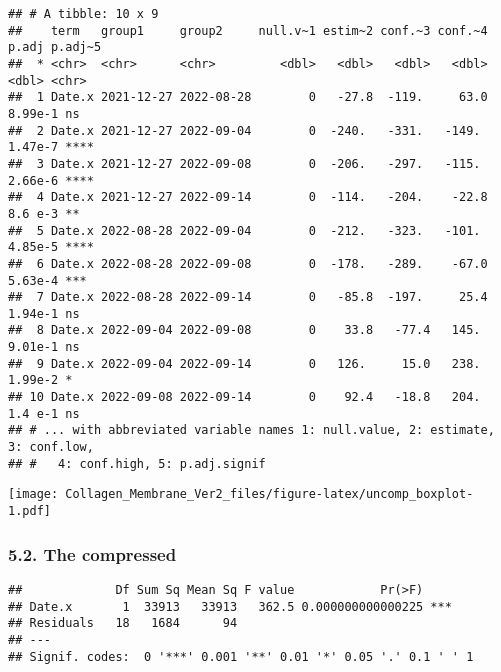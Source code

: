 \documentclass[
]{article}
\newenvironment{Shaded}{\begin{snugshade}}{\end{snugshade}}
\newcommand{\AttributeTok}[1]{\textcolor[rgb]{0.77,0.63,0.00}{#1}}
\newcommand{\FunctionTok}[1]{\textcolor[rgb]{0.00,0.00,0.00}{#1}}
\newcommand{\NormalTok}[1]{#1}
\newcommand{\OtherTok}[1]{\textcolor[rgb]{0.56,0.35,0.01}{#1}}
\newcommand{\SpecialCharTok}[1]{\textcolor[rgb]{0.00,0.00,0.00}{#1}}
\newcommand{\StringTok}[1]{\textcolor[rgb]{0.31,0.60,0.02}{#1}}
\begin{document}
\begin{verbatim}
## # A tibble: 10 x 9
##    term   group1     group2     null.v~1 estim~2 conf.~3 conf.~4   p.adj p.adj~5
##  * <chr>  <chr>      <chr>         <dbl>   <dbl>   <dbl>   <dbl>   <dbl> <chr>  
##  1 Date.x 2021-12-27 2022-08-28        0   -27.8  -119.     63.0 8.99e-1 ns     
##  2 Date.x 2021-12-27 2022-09-04        0  -240.   -331.   -149.  1.47e-7 ****   
##  3 Date.x 2021-12-27 2022-09-08        0  -206.   -297.   -115.  2.66e-6 ****   
##  4 Date.x 2021-12-27 2022-09-14        0  -114.   -204.    -22.8 8.6 e-3 **     
##  5 Date.x 2022-08-28 2022-09-04        0  -212.   -323.   -101.  4.85e-5 ****   
##  6 Date.x 2022-08-28 2022-09-08        0  -178.   -289.    -67.0 5.63e-4 ***    
##  7 Date.x 2022-08-28 2022-09-14        0   -85.8  -197.     25.4 1.94e-1 ns     
##  8 Date.x 2022-09-04 2022-09-08        0    33.8   -77.4   145.  9.01e-1 ns     
##  9 Date.x 2022-09-04 2022-09-14        0   126.     15.0   238.  1.99e-2 *      
## 10 Date.x 2022-09-08 2022-09-14        0    92.4   -18.8   204.  1.4 e-1 ns     
## # ... with abbreviated variable names 1: null.value, 2: estimate, 3: conf.low,
## #   4: conf.high, 5: p.adj.signif
\end{verbatim}

\texttt{[image: Collagen\_Membrane\_Ver2\_files/figure-latex/uncomp\_boxplot-1.pdf]}

\hypertarget{the-compressed-3}{%
\subsubsection{5.2. The compressed}\label{the-compressed-3}}

\begin{Shaded}
\end{Shaded}

\begin{verbatim}
##             Df Sum Sq Mean Sq F value            Pr(>F)    
## Date.x       1  33913   33913   362.5 0.000000000000225 ***
## Residuals   18   1684      94                              
## ---
## Signif. codes:  0 '***' 0.001 '**' 0.01 '*' 0.05 '.' 0.1 ' ' 1
\end{verbatim}
\end{document}
